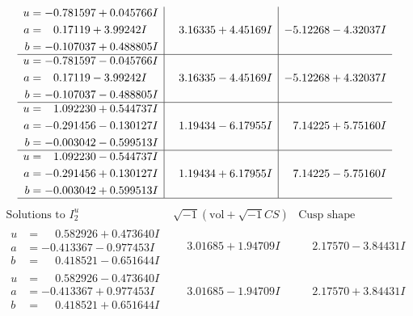 \documentclass[1p]{elsarticle_modified}
\theoremstyle{definition}
\newcommand{\I}{\sqrt{-1}}
\begin{document}
$$\begin{array}{c|c|c}
\begin{aligned}
u &= -0.781597 + 0.045766 I \\
a &= \phantom{-}0.17119 + 3.99242 I \\
b &= -0.107037 + 0.488805 I\end{aligned}
 & \phantom{-}3.16335 + 4.45169 I & -5.12268 - 4.32037 I \\ \hline\begin{aligned}
u &= -0.781597 - 0.045766 I \\
a &= \phantom{-}0.17119 - 3.99242 I \\
b &= -0.107037 - 0.488805 I\end{aligned}
 & \phantom{-}3.16335 - 4.45169 I & -5.12268 + 4.32037 I \\ \hline\begin{aligned}
u &= \phantom{-}1.092230 + 0.544737 I \\
a &= -0.291456 - 0.130127 I \\
b &= -0.003042 - 0.599513 I\end{aligned}
 & \phantom{-}1.19434 - 6.17955 I & \phantom{-}7.14225 + 5.75160 I \\ \hline\begin{aligned}
u &= \phantom{-}1.092230 - 0.544737 I \\
a &= -0.291456 + 0.130127 I \\
b &= -0.003042 + 0.599513 I\end{aligned}
 & \phantom{-}1.19434 + 6.17955 I & \phantom{-}7.14225 - 5.75160 I\\
 \hline 
 \end{array}$$\newpage$$\begin{array}{c|c|c}  
\text{Solutions to }I^u_{2}& \I (\text{vol} + \sqrt{-1}CS) & \text{Cusp shape}\\
 \hline 
\begin{aligned}
u &= \phantom{-}0.582926 + 0.473640 I \\
a &= -0.413367 - 0.977453 I \\
b &= \phantom{-}0.418521 - 0.651644 I\end{aligned}
 & \phantom{-}3.01685 + 1.94709 I & \phantom{-}2.17570 - 3.84431 I \\ \hline\begin{aligned}
u &= \phantom{-}0.582926 - 0.473640 I \\
a &= -0.413367 + 0.977453 I \\
b &= \phantom{-}0.418521 + 0.651644 I\end{aligned}
 & \phantom{-}3.01685 - 1.94709 I & \phantom{-}2.17570 + 3.84431 I \\ \hline\begin{aligned}

\end{aligned}
\end{array}$$
\end{document}
